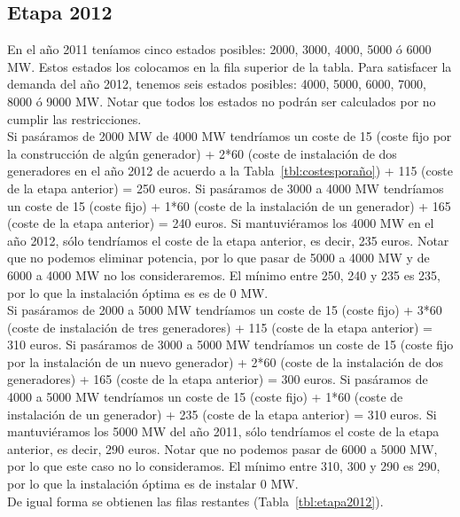 \documentclass[12pt,a4paper,twoside,openright,titlepage,final]{article}
\begin{document}
\subsection{Etapa 2012}

En el año 2011 teníamos cinco estados posibles: 2000, 3000, 4000, 5000 ó 6000 MW. Estos estados los colocamos en la fila superior de la tabla. Para satisfacer la demanda del año 2012, tenemos seis estados posibles: 4000, 5000, 6000, 7000, 8000 ó 9000 MW. Notar que todos los estados no podrán ser calculados por no cumplir las restricciones.\\

Si pasáramos de 2000 MW de 4000 MW tendríamos un coste de 15 (coste fijo por la construcción de algún generador) + 2*60 (coste de instalación de dos generadores en el año 2012 de acuerdo a la Tabla~\ref{tbl:costesporaño}) + 115 (coste de la etapa anterior) = 250 euros. Si pasáramos de 3000 a 4000 MW tendríamos un coste de 15 (coste fijo) + 1*60 (coste de la instalación de un generador) + 165 (coste de la etapa anterior) = 240 euros. Si mantuviéramos los 4000 MW en el año 2012, sólo tendríamos el coste de la etapa anterior, es decir, 235 euros. Notar que no podemos eliminar potencia, por lo que pasar de 5000 a 4000 MW y de 6000 a 4000 MW no los consideraremos. El mínimo entre 250, 240 y 235 es 235, por lo que la instalación óptima es es de 0 MW.\\

Si pasáramos de 2000 a 5000 MW tendríamos un coste de 15 (coste fijo) + 3*60 (coste de instalación de tres generadores) + 115 (coste de la etapa anterior) = 310 euros. Si pasáramos de 3000 a 5000 MW tendríamos un coste de 15 (coste fijo por la instalación de un nuevo generador) + 2*60 (coste de la instalación de dos generadores) + 165 (coste de la etapa anterior) = 300 euros. Si pasáramos de 4000 a 5000 MW tendríamos un coste de 15 (coste fijo) + 1*60 (coste de instalación de un generador) + 235 (coste de la etapa anterior) = 310 euros. Si mantuviéramos los 5000 MW del año 2011, sólo tendríamos el coste de la etapa anterior, es decir, 290 euros. Notar que no podemos pasar de 6000 a 5000 MW, por lo que este caso no lo consideramos. El mínimo entre 310, 300 y 290 es 290, por lo que la instalación óptima es de instalar 0 MW.\\

De igual forma se obtienen las filas restantes (Tabla~\ref{tbl:etapa2012}).\\
\end{document}
